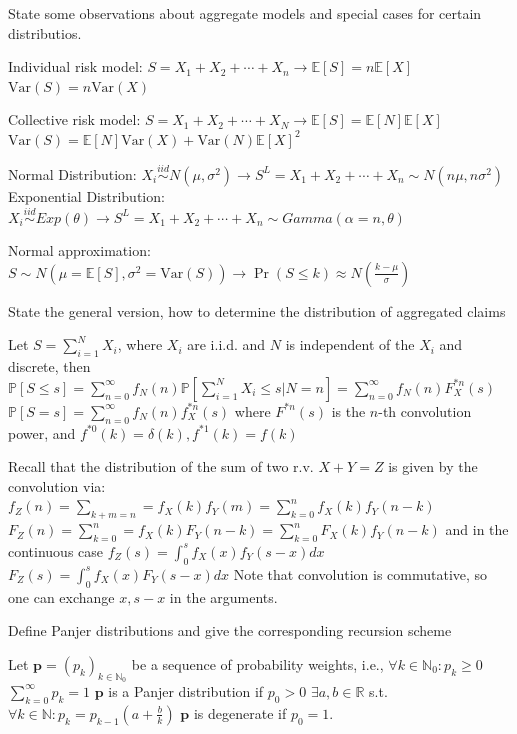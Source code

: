 State some observations about aggregate models and special cases for certain distributios.

Individual risk model:  
\(
S = X_1 + X_2 + \cdots + X_n \rightarrow \mathbb{E}[S] = n\mathbb{E}[X]
\)
\(
\text{Var}(S) = n \text{Var}(X)
\)

Collective risk model:  
\(
S = X_1 + X_2 + \cdots + X_N \rightarrow \mathbb{E}[S] = \mathbb{E}[N]\mathbb{E}[X]
\)
\(
\text{Var}(S) = \mathbb{E}[N] \text{Var}(X) + \text{Var}(N) \mathbb{E}[X]^2
\)

Normal Distribution:  
\(
X_i \overset{iid}{\sim} N(\mu, \sigma^2) \rightarrow S^L = X_1 + X_2 + \cdots + X_n \sim N(n\mu, n\sigma^2)
\)
Exponential Distribution:  
\(
X_i \overset{iid}{\sim} Exp(\theta) \rightarrow S^L = X_1 + X_2 + \cdots + X_n \sim Gamma(\alpha = n, \theta)
\)

Normal approximation:  
\(
S \sim N(\mu = \mathbb{E}[S], \sigma^2 = \text{Var}(S)) \rightarrow \Pr(S \leq k) \approx N\left( \frac{k - \mu}{\sigma} \right)
\)


State the general version, how to determine the distribution of aggregated claims

Let \( S = \sum_{i=1}^N X_i \), where \( X_i \) are i.i.d. and \( N \) is independent of the \( X_i \) and discrete, then
\( \mathbb{P}[S \leq s] = \sum_{n=0}^\infty f_N(n)\mathbb{P}[\sum_{i=1}^N X_i \leq s|N=n] = \sum_{n=0}^\infty f_N(n)F^{\ast n}_X(s)\)
\( \mathbb{P}[S = s] = \sum_{n=0}^\infty f_N(n)f^{\ast n}_X(s)\)
where \( F^{\ast n}(s) \) is the \( n \)-th convolution power, and \( f^{\ast 0}(k) = \delta(k), f^{\ast 1}(k) = f(k) \)

Recall that the distribution of the sum of two r.v. \( X + Y = Z \) is given by the convolution via:
\( f_Z(n) = \sum_{k+m=n} = f_X(k)f_Y(m) = \sum_{k=0}^n f_X(k)f_Y(n-k) \)
\( F_Z(n) = \sum_{k=0}^n = f_X(k)F_Y(n-k) = \sum_{k=0}^n F_X(k)f_Y(n-k) \)
and in the continuous case
\( f_Z(s) = \int_{0}^s f_X(x)f_Y(s - x)dx \)
\( F_Z(s) = \int_{0}^s f_X(x)F_Y(s - x)dx \)
Note that convolution is commutative, so one can exchange \( x,s-x \) in the arguments. 


Define Panjer distributions and give the corresponding recursion scheme

Let \(\mathbf{p} = (p_k)_{k \in \mathbb{N}_0}\) be a sequence of probability weights, i.e.,
\(\forall k \in \mathbb{N}_0: p_k \ge 0\)
\(\sum_{k=0}^\infty p_k = 1\)
\(\mathbf{p}\) is a Panjer distribution if
\(p_0 > 0\)
\(\exists a, b \in \mathbb{R}\) s.t. \(\forall k \in \mathbb{N}: p_k = p_{k-1} \left(a + \frac{b}{k}\right)\)
\(\mathbf{p}\) is degenerate if \(p_0 = 1\).


